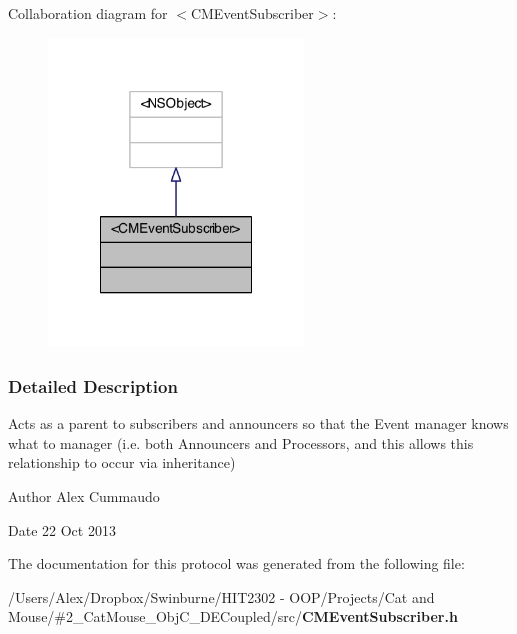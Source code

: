 Collaboration diagram for $<$C\-M\-Event\-Subscriber$>$\-:
\nopagebreak
\begin{figure}[H]
\begin{center}
\leavevmode
\includegraphics[width=192pt]{protocol_c_m_event_subscriber-p__coll__graph}
\end{center}
\end{figure}


\subsubsection{Detailed Description}
Acts as a parent to subscribers and announcers so that the Event manager knows what to manager (i.\-e. both Announcers and Processors, and this allows this relationship to occur via inheritance) 

\begin{DoxyAuthor}{Author}
Alex Cummaudo 
\end{DoxyAuthor}
\begin{DoxyDate}{Date}
22 Oct 2013 
\end{DoxyDate}


The documentation for this protocol was generated from the following file\-:\begin{DoxyCompactItemize}
\item 
/\-Users/\-Alex/\-Dropbox/\-Swinburne/\-H\-I\-T2302 -\/ O\-O\-P/\-Projects/\-Cat and Mouse/\#2\-\_\-\-Cat\-Mouse\-\_\-\-Obj\-C\-\_\-\-D\-E\-Coupled/src/{\bf C\-M\-Event\-Subscriber.\-h}\end{DoxyCompactItemize}
